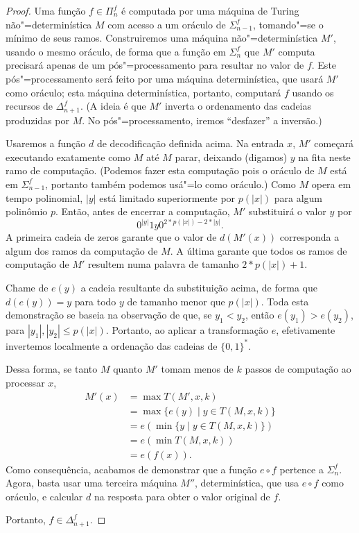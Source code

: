 \begin{proof}
    Uma função $f \in \Pi_n^f$
    é computada por uma máquina de Turing não"=determinística $M$
    com acesso a um oráculo de $\Sigma_{n-1}^f$,
    tomando"=se o mínimo de seus ramos.
    Construiremos uma máquina não"=determinística $M'$,
    usando o mesmo oráculo,
    de forma que a função em $\Sigma_n^f$ que $M'$ computa
    precisará apenas de um pós"=processamento
    para resultar no valor de $f$.
    Este pós"=processamento será feito por uma máquina determinística,
    que usará $M'$ como oráculo;
    esta máquina determinística,
    portanto, computará $f$ usando os recursos de $\Delta_{n+1}^f$.
    (A ideia é que $M'$ inverta o ordenamento das cadeias
    produzidas por $M$.
    No pós"=processamento, iremos ``desfazer'' a inversão.)

    Usaremos a função $d$ de decodificação definida acima.
    Na entrada $x$, $M'$ começará executando exatamente como $M$
    até $M$ parar, deixando (digamos) $y$ na fita neste ramo de computação.
    (Podemos fazer esta computação pois o oráculo de $M$
    está em $\Sigma_{n-1}^f$,
    portanto também podemos usá"=lo como oráculo.)
    Como $M$ opera em tempo polinomial,
    $|y|$ está limitado superiormente por $p(|x|)$ para algum polinômio $p$.
    Então,
    antes de encerrar a computação,
    $M'$ substituirá o valor $y$ por
    \begin{equation*}
        0^{|y|}1 y 0^{2*p(|x|) - 2*|y|}.
    \end{equation*}
    A primeira cadeia de zeros garante que o valor de $d(M'(x))$
    corresponda a algum dos ramos da computação de $M$.
    A última garante que todos os ramos de computação de $M'$
    resultem numa palavra de tamanho $2*p(|x|)+1$.

    Chame de $e(y)$ a cadeia resultante da substituição acima,
    de forma que $d(e(y)) = y$
    para todo $y$ de tamanho menor que $p(|x|)$.
    Toda esta demonstração se baseia na observação de que,
    se $y_1 < y_2$, então $e(y_1) > e(y_2)$,
    para $|y_1|, |y_2| \leq p(|x|)$.
    Portanto,
    ao aplicar a transformação $e$,
    efetivamente invertemos localmente a ordenação das cadeias de $\{0, 1\}^*$.

    Dessa forma, se tanto $M$ quanto $M'$ tomam menos de $k$ passos de computação
    ao processar $x$,
    \begin{align*}
        M'(x) &= \max T(M', x, k) \\
              &= \max \{e(y) \mid y \in T(M, x, k) \} \\
              &= e \left( \min \{y \mid y \in T(M, x, k) \} \right) \\
              &= e \left( \min T(M, x, k) \right) \\
              &= e( f(x) ).
    \end{align*}
    Como consequência,
    acabamos de demonstrar que a função $e \circ f$ pertence a $\Sigma_n^f$.
    Agora,
    basta usar uma terceira máquina $M''$,
    determinística,
    que usa $e \circ f$ como oráculo,
    e calcular $d$ na resposta para obter o valor original de $f$.

    Portanto, $f \in \Delta_{n+1}^f$.
\end{proof}
